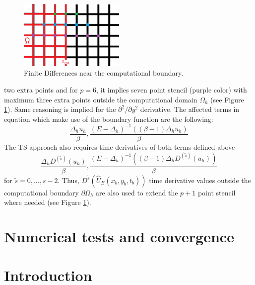 \documentclass[11pt,a4paper,twoside]{article}
\begin{document}
\begin{figure}[ht]%
\begin{center}
\includegraphics[width=2in]{Pictures/BoundaryPicture.png}
	\caption{Finite Differences near the computational boundary.}
	\label{fig:BoundaryFD}
  \end{center}
\end{figure}
two extra points and for $p=6$, it implies seven point stencil (purple color) with maximum three extra points outside the computational domain $\Omega_h$ (see Figure \ref{fig:BoundaryFD}). Same reasoning is implied for the $\partial^2 / \partial y^2$ derivative. The affected terms in equation  which make use of the boundary function  are the following:
\begin{equation*}
\frac{ \Delta_h u_h}{\beta}, \frac{ (E - \Delta_h)^{-1} ( (\beta -1)\Delta_h u_h) }{\beta}
\end{equation*}
The TS approach also requires time derivatives of both terms defined above
\begin{equation*}
\frac{ \Delta_h D^{(\tilde s)} (u_h)}{\beta}, \frac{ (E - \Delta_h)^{-1} ( (\beta -1)\Delta_h D^{(\tilde s)}(u_h) ) }{\beta}
\end{equation*}
for $\tilde s = 0, ..., s-2$.  Thus, $D^{\tilde s}(\widehat U_B(x_b , y_b, t_b))$  time derivative values outside the computational boundary $\partial \Omega_h$ are also used to extend the $p+1$ point stencil where needed (see Figure  \ref{fig:BoundaryFD}).

\section{Numerical tests and convergence}\label{NumTests}

\section{Introduction}
\end{document}
